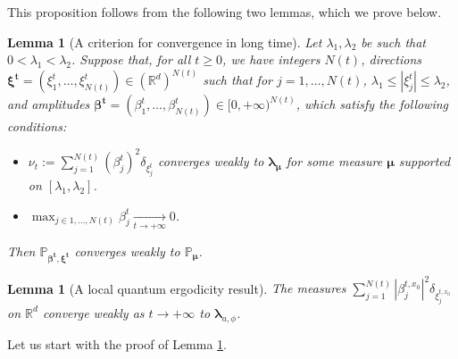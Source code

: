 \documentclass[JEP,XML,SOM,Unicode,published]{cedram}
\theoremstyle{plain}
\newtheorem{lemma}[theorem]{Lemma}
\theoremstyle{definition}
\newcommand{\R}{\mathbb{R}}
\begin{document}
This proposition follows from the following two lemmas, which we prove below.

\begin{lemma}[A criterion for convergence in long time]\label{lem:WeakConv2}
Let $\lambda_1,\lambda_2$ be such that $0<\lambda_1<\lambda_2$.
Suppose that, for all $t\geq 0$, we have integers $N(t)$, directions $\boldsymbol{\xi^t}= (\xi_1^t,\dots, \xi_{N(t)}^t) \in \left(\R^d\right)^{N(t)}$ such that for $j=1,\dots,N(t)$, $\lambda_1\leq |\xi_j^t|\leq \lambda_2$, and amplitudes $\boldsymbol{\beta^t}= (\beta_1^{t},\dots, \beta_{N(t)}^t) \in [0, +\infty)^{N(t)}$, which satisfy the following conditions:
\begin{itemize}
\item $\nu_t:= \sum_{j=1}^{N(t)} (\beta^t_j)^2 \delta_{\xi^t_j}$ converges weakly to $\boldsymbol{\lambda_\mu}$ for some measure $\boldsymbol{\mu}$ supported on $[\lambda_1,\lambda_2]$.
\item $\max_{j\in 1,\dots, N(t)} \beta_j^t \underset{t\to +\infty}{\to} 0$.
\end{itemize}
Then $\mathbb{P}_{\boldsymbol{\beta^t}, \boldsymbol{\xi^t}}$ converges weakly to $\mathbb{P}_{\boldsymbol{\mu}}$.
\end{lemma}

\begin{lemma}[A local quantum ergodicity result]\label{lem:EquidSCPonct}
The measures $\sum_{j=1}^{N(t)} |\beta^{t,x_0}_j|^2 \delta_{\xi^{t,x_0}_j}$ on $\R^d$ converge weakly as $t\to +\infty$ to $\boldsymbol{\lambda}_{a,\phi}$.
\end{lemma}

Let us start with the proof of Lemma \ref{lem:WeakConv2}.
\end{document}
